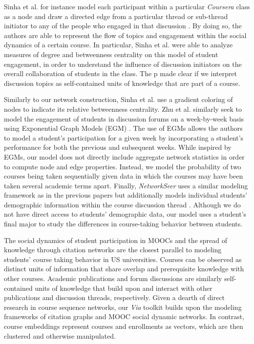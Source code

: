 \documentclass{sigchi}
\begin{document}
Sinha et al. for instance model each participant within a particular \textit{Coursera} class as a node and draw a directed edge from a particular thread or sub-thread initiator to any of the people who engaged in that discussion \cite{Sinha2014}. By doing so, the authors are able to represent the flow of topics and engagement within the social dynamics of a certain course. In particular, Sinha et al. were able to analyze measures of degree and betweenness centrality on this model of student engagement, in order to understand the influence of discussion initiators on the overall collaboration of students in the class. The p made clear if we interpret discussion topics as self-contained units of knowledge that are part of a course. 

Similarly to our network construction, Sinha et al. use a gradient
coloring of nodes to indicate its relative betweenness
centrality. Zhu et al. similarly seek to model the engagement of
students in discussion forums on a week-by-week basis using
Exponential Graph Models (EGM) \cite{Zhu2016}. The use of EGMs allows
the authors to model a student's participation for a given week by
incorporating a student's performance for both the previous and
subsequent weeks. While inspired by EGMs, our model does not directly
include aggregate network statistics in order to compute node and edge
properties. Instead, we model the probability of two courses
being taken sequentially given data in which the courses may have been
taken several academic terms apart. Finally, \textit{NetworkSeer} uses a similar modeling framework as in the previous papers but additionally models individual students' demographic information within the course discussion thread \cite{Wu2016}. Although we do not have direct access to students' demographic data, our model uses a student's final major to study the differences in course-taking behavior between students.


The social dynamics of student participation in MOOCs and the spread
of knowledge through citation networks are the closest parallel to
modeling students' course taking behavior in US universities. Courses can
be observed as distinct units of information that share overlap and
prerequisite knowledge with other courses. Academic publications and
forum discussions are similarly self-contained units of knowledge that
build upon and interact with other publications and discussion
threads, respectively. Given a dearth of direct research in course
sequence networks, our \textit{Via} toolkit builds upon the modeling
frameworks of citation graphs and MOOC social dynamic networks. In
contrast, course embeddings \cite{pard2018} represent courses and
enrollments as vectors, which are then clustered and otherwise
manipulated.
\end{document}

